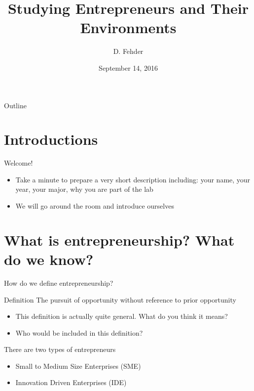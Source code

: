 \documentclass{beamer}
\title{Studying Entrepreneurs and Their Environments}
\author{D. Fehder\inst{1} \inst{2}}
\institute[Rice University] %
{
  \inst{1}%
  Rice University
  \and
  \inst{2}%
  TIES Group\\
  MIT Sloan}
\date{September 14, 2016}
\begin{document}
\begin{frame}
  \titlepage
\end{frame}

\begin{frame}{Outline}
  \tableofcontents
\end{frame}

\section{Introductions}

\begin{frame}{Welcome!}
  \begin{itemize}
      \item{Take a minute to prepare a very short description including: your name, your year, your major, why you are part of the lab}
      \item{We will go around the room and introduce ourselves}
  \end{itemize}
\end{frame}

\section{What is entrepreneurship? What do we know?}

\begin{frame}{How do we define entrepreneurship?}
\begin{block}{Definition}
The pursuit of opportunity without reference to prior opportunity
\end{block}
  \begin{itemize}
  \item {
    This definition is actually quite general. What do you think it means?
  }
  \item {
    Who would be included in this definition?
  }
  \end{itemize}
\end{frame}

\begin{frame}{There are two types of entrepreneurs}
  \begin{itemize}
      \item{Small to Medium Size Enterprises (SME)}
      \item{Innovation Driven Enterprises (IDE)}
  \end{itemize}
\end{frame}
\end{document}
